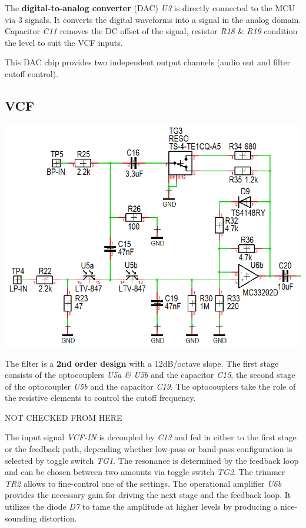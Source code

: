 \documentclass{scrartcl}
\begin{document}
The \textbf{digital-to-analog converter} (DAC) \emph{U3} is directly connected to the MCU via 3 signals. It converts the digital waveforms into a signal in the analog domain. Capacitor \emph{C11} removes the DC offset of the signal, resistor \emph{R18} \& \emph{R19} condition the level to suit the VCF inputs.

This DAC chip provides two independent output channels (audio out and filter cutoff control).

\subsection{VCF}

\begin{center}
    \includegraphics[scale=0.50]{assets/schema-vcf.png}
\end{center}

The filter is a \textbf{2nd order design} with a 12dB/octave slope. The first stage consists of the optocouplers \emph{U5a \& U5b} and the capacitor \emph{C15}, the second stage of the optocoupler \emph{U5b} and the capacitor \emph{C19}. The optocouplers take the role of the resistive elements to control the cutoff frequency.

NOT CHECKED FROM HERE

The input signal \emph{VCF-IN} is decoupled by \emph{C13} and fed in either to the first stage or the feedback path, depending whether low-pass or band-pass configuration is selected by toggle switch \emph{TG1}. The resonance is determined by the feedback loop and can be chosen between two amounts via toggle switch \emph{TG2}. The trimmer \emph{TR2} allows to fine-control one of the settings. The operational amplifier \emph{U6b} provides the necessary gain for driving the next stage and the feedback loop. It utilizes the diode \emph{D7} to tame the amplitude at higher levels by producing a nice-sounding distortion.
\end{document}
